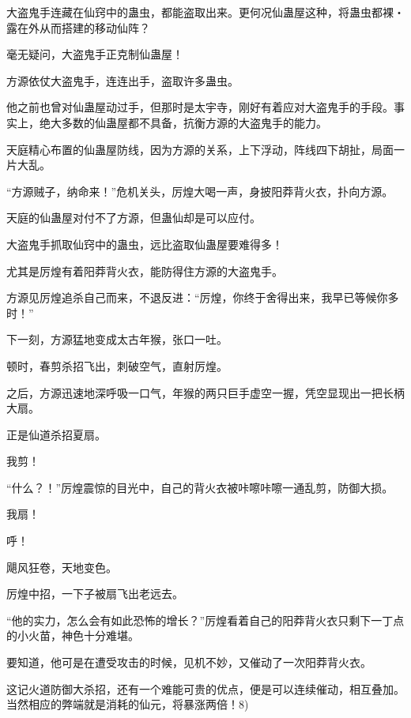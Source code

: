 \begin{this_body}
大盗鬼手连藏在仙窍中的蛊虫，都能盗取出来。更何况仙蛊屋这种，将蛊虫都裸・露在外从而搭建的移动仙阵？

毫无疑问，大盗鬼手正克制仙蛊屋！

方源依仗大盗鬼手，连连出手，盗取许多蛊虫。

他之前也曾对仙蛊屋动过手，但那时是太宇寺，刚好有着应对大盗鬼手的手段。事实上，绝大多数的仙蛊屋都不具备，抗衡方源的大盗鬼手的能力。

天庭精心布置的仙蛊屋防线，因为方源的关系，上下浮动，阵线四下胡扯，局面一片大乱。

“方源贼子，纳命来！”危机关头，厉煌大喝一声，身披阳莽背火衣，扑向方源。

天庭的仙蛊屋对付不了方源，但蛊仙却是可以应付。

大盗鬼手抓取仙窍中的蛊虫，远比盗取仙蛊屋要难得多！

尤其是厉煌有着阳莽背火衣，能防得住方源的大盗鬼手。

方源见厉煌追杀自己而来，不退反进：“厉煌，你终于舍得出来，我早已等候你多时！”

下一刻，方源猛地变成太古年猴，张口一吐。

顿时，春剪杀招飞出，刺破空气，直射厉煌。

之后，方源迅速地深呼吸一口气，年猴的两只巨手虚空一握，凭空显现出一把长柄大扇。

正是仙道杀招夏扇。

我剪！

“什么？！”厉煌震惊的目光中，自己的背火衣被咔嚓咔嚓一通乱剪，防御大损。

我扇！

呼！

飓风狂卷，天地变色。

厉煌中招，一下子被扇飞出老远去。

“他的实力，怎么会有如此恐怖的增长？”厉煌看着自己的阳莽背火衣只剩下一丁点的小火苗，神色十分难堪。

要知道，他可是在遭受攻击的时候，见机不妙，又催动了一次阳莽背火衣。

这记火道防御大杀招，还有一个难能可贵的优点，便是可以连续催动，相互叠加。当然相应的弊端就是消耗的仙元，将暴涨两倍！8)

\end{this_body}

